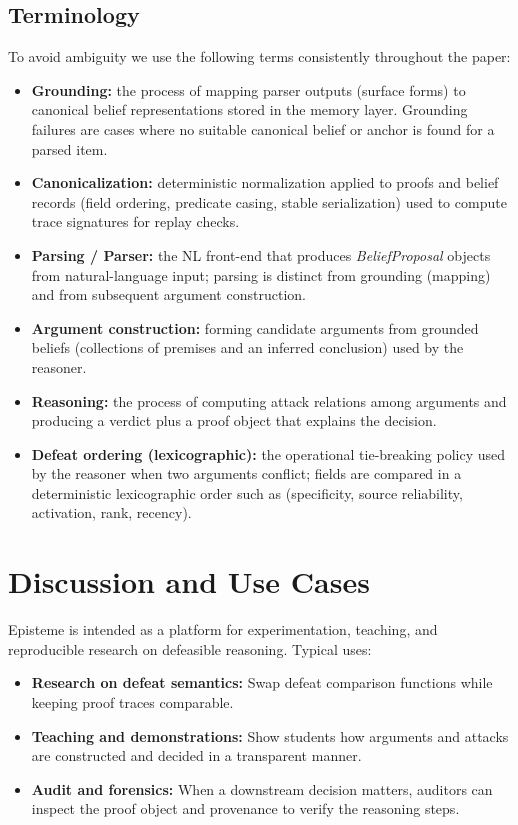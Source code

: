 \documentclass[11pt]{article}
\begin{document}
\subsection{Terminology}
To avoid ambiguity we use the following terms consistently throughout the paper:
\begin{itemize}
  \item \textbf{Grounding:} the process of mapping parser outputs (surface forms)
    to canonical belief representations stored in the memory layer. Grounding failures
    are cases where no suitable canonical belief or anchor is found for a parsed item.
  \item \textbf{Canonicalization:} deterministic normalization applied to proofs and
    belief records (field ordering, predicate casing, stable serialization) used to
    compute trace signatures for replay checks.
  \item \textbf{Parsing / Parser:} the NL front-end that produces \emph{BeliefProposal}
    objects from natural-language input; parsing is distinct from grounding (mapping)
    and from subsequent argument construction.
  \item \textbf{Argument construction:} forming candidate arguments from grounded
    beliefs (collections of premises and an inferred conclusion) used by the reasoner.
  \item \textbf{Reasoning:} the process of computing attack relations among arguments
    and producing a verdict plus a proof object that explains the decision.
  \item \textbf{Defeat ordering (lexicographic):} the operational tie-breaking policy
    used by the reasoner when two arguments conflict; fields are compared in a
    deterministic lexicographic order such as (specificity, source
    reliability, activation, rank, recency).
\end{itemize}

\section{Discussion and Use Cases}
Episteme is intended as a platform for experimentation, teaching, and reproducible
research on defeasible reasoning. Typical uses:
\begin{itemize}
  \item \textbf{Research on defeat semantics:} Swap defeat comparison functions while
    keeping proof traces comparable.
  \item \textbf{Teaching and demonstrations:} Show students how arguments and attacks
    are constructed and decided in a transparent manner.
  \item \textbf{Audit and forensics:} When a downstream decision matters, auditors can
    inspect the proof object and provenance to verify the reasoning steps.
\end{itemize}
\end{document}
